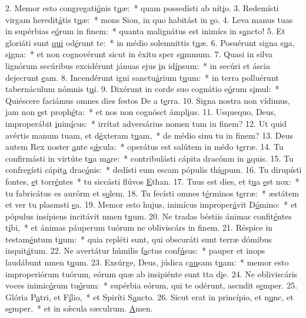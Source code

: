 2. Memor esto congregati\uline{ó}nis t\uline{u}æ:~* quam possedísti ab nít\uline{i}o.
3. Redemísti virgam heredit\uline{á}tis t\uline{u}æ:~* mons Sion, in quo habitást in \uline{e}o.
4. Leva manus tuas in supérbias e\uline{ó}rum in f\uline{i}nem:~* quanta malignátus est inimícs in s\uline{a}ncto!
5. Et gloriáti sunt \uline{qui} od\uline{é}runt te:~* in médio solemnittis t\uline{u}æ.
6. Posuérunt signa s\uline{u}a, s\uline{i}gna:~* et non cognovérunt sicut in éxitu sper s\uline{u}mmum.
7. Quasi in silva lignórum secúribus excidérunt jánuas ejus \uline{i}n id\uline{í}psum:~* in secúri et áscia dejecrunt \uline{e}am.
8. Incendérunt igni sanctu\uline{á}rium t\uline{u}um:~* in terra polluérunt tabernáculum nómnis t\uline{u}i.
9. Dixérunt in corde suo cognátio e\uline{ó}rum s\uline{i}mul:~* Quiéscere faciámus omnes dies festos De a t\uline{e}rra.
10. Signa nostra non vídimus, jam non \uline{e}st proph\uline{é}ta:~* et nos non cognósct ámpl\uline{i}us.
11. Usquequo, Deus, improperábit \uline{i}nim\uline{í}cus:~* irrítat adversárius nomen tum in f\uline{i}nem?
12. Ut quid avértis manum tuam, et d\uline{é}xteram t\uline{u}am,~* de médio sinu tu in f\uline{i}nem?
13. Deus autem Rex noster \uline{a}nte s\uline{ǽ}cula:~* operátus est salútem in médo t\uline{e}rræ.
14. Tu confirmásti in virtúte t\uline{u}a m\uline{a}re:~* contribulásti cápita dracónm in \uline{a}quis.
15. Tu confregísti cápit\uline{a} drac\uline{ó}nis:~* dedísti eum escam pópulis thí\uline{o}pum.
16. Tu dirupísti fontes, \uline{e}t torr\uline{é}ntes~* tu siccásti flúvos \uline{E}than.
17. Tuus est dies, et t\uline{u}a \uline{e}st nox:~* tu fabricátus es aurórm et s\uline{o}lem.
18. Tu fecísti omnes t\uline{é}rminos t\uline{e}rræ:~* æstátem et ver tu plasmsti \uline{e}a.
19. Memor esto hujus, inimícus improper\uline{á}vit D\uline{ó}mino:~* et pópulus insípiens incitávit nmen t\uline{u}um.
20. Ne tradas béstiis ánimas confit\uline{é}ntes t\uline{i}bi,~* et ánimas páuperum tuórum ne obliviscárs in f\uline{i}nem.
21. Réspice in testam\uline{é}ntum t\uline{u}um:~* quia repléti sunt, qui obscuráti sunt terræ dómibus inquit\uline{á}tum.
22. Ne avertátur húmilis f\uline{a}ctus conf\uline{ú}sus:~* pauper et inops laudábunt nmen t\uline{u}um.
23. Exsúrge, Deus, júdica c\uline{au}sam t\uline{u}am:~* memor esto improperiórum tuórum, eórum quæ ab insipiénte sunt tta d\uline{i}e.
24. Ne obliviscáris voces inimic\uline{ó}rum tu\uline{ó}rum:~* supérbia eórum, qui te odérunt, ascndit s\uline{e}mper.
25. Glória P\uline{a}tri, et F\uline{í}lio,~* et Spiríti S\uline{a}ncto.
26. Sicut erat in princípio, et n\uline{u}nc, et s\uline{e}mper,~* et in sǽcula sæculrum. \uline{A}men.

